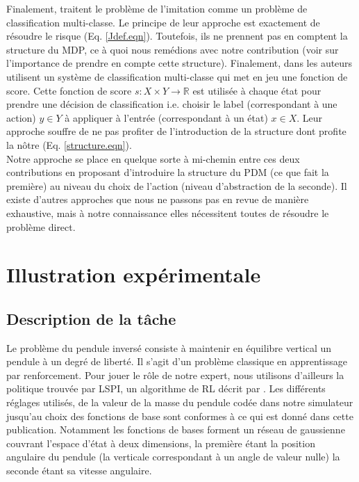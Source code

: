 \documentclass[publibook-draft]{CAp2012}
\begin{document}
Finalement, \citep{ratliff2007imitation} traitent le problème de l'imitation comme un problème de classification multi-classe. Le principe de leur approche est exactement de résoudre le risque (Eq. \eqref{Jdef.eqn}). Toutefois, ils ne prennent pas en comptent la structure du MDP, ce à quoi nous remédions avec notre contribution (voir \cite{melo2010learning} sur l'importance de prendre en compte cette structure).
Finalement, dans \citep{ratliff2007imitation} les auteurs utilisent un système de classification multi-classe qui met en jeu une fonction de score. Cette fonction de score $s : X\times Y \rightarrow \mathbb{R}$ est utilisée à chaque état pour prendre une décision de classification i.e. choisir le label (correspondant à une action) $y\in Y$ à appliquer à l'entrée (correspondant à un état) $x\in X$. Leur approche souffre de ne pas profiter de l'introduction de la structure dont profite la nôtre (Eq. \eqref{structure.eqn}).\\

Notre approche se place en quelque sorte à mi-chemin entre ces deux contributions en proposant d'introduire la structure du PDM (ce que fait la première) au niveau du choix de l'action (niveau d'abstraction de la seconde). Il existe d'autres approches que nous ne passons pas en revue de manière exhaustive, mais à notre connaissance elles nécessitent toutes de résoudre le problème direct.
\section{Illustration expérimentale}
\label{exp.sec}
\subsection{Description de la tâche}
Le problème du pendule inversé consiste à maintenir en équilibre vertical un pendule à un degré de liberté. Il s'agit d'un problème classique en apprentissage par renforcement. Pour jouer le rôle de notre expert, nous utilisons d'ailleurs la politique trouvée par LSPI, un algorithme de RL décrit par \citet{lagoudakis2003least}. Les différents réglages utilisés, de la valeur de la masse du pendule codée dans notre simulateur jusqu'au choix des fonctions de base sont conformes à ce qui est donné dans cette publication. Notamment les fonctions de bases forment un réseau de gaussienne couvrant l'espace d'état à deux dimensions, la première étant la position angulaire du pendule (la verticale correspondant à un angle de valeur nulle) la seconde étant sa vitesse angulaire.\\
\end{document}
